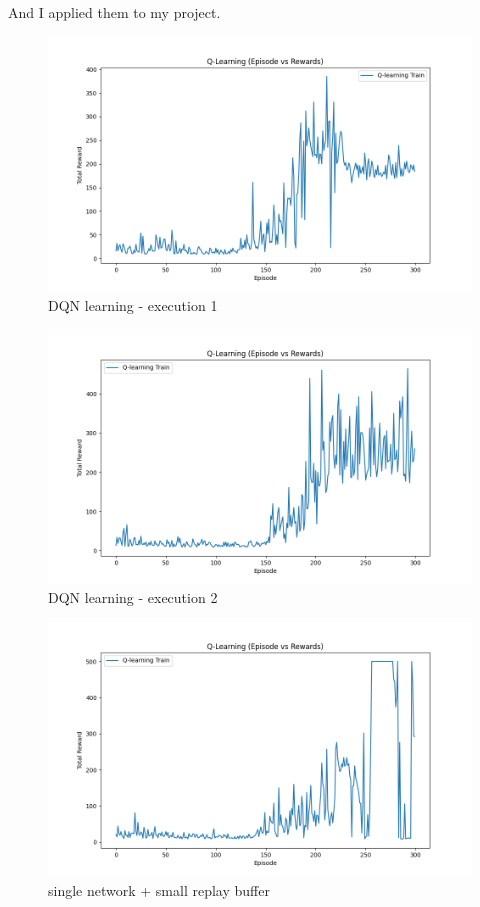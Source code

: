 \documentclass{article}
\begin{document}
And I applied them to my project.

\begin{figure}
  \includegraphics[width=\linewidth]{DQN-0003.png}
  \caption{DQN learning - execution 1}
  \label{fig:dqn-3}
\end{figure}

\begin{figure}
  \includegraphics[width=\linewidth]{DQN-0004.png}
  \caption{DQN learning - execution 2}
  \label{fig:dqn-4}
\end{figure}

\begin{figure}
  \includegraphics[width=\linewidth]{DQN-0001.png}
  \caption{single network + small replay buffer}
  \label{fig:dqn-1}
\end{figure}
\end{document}

